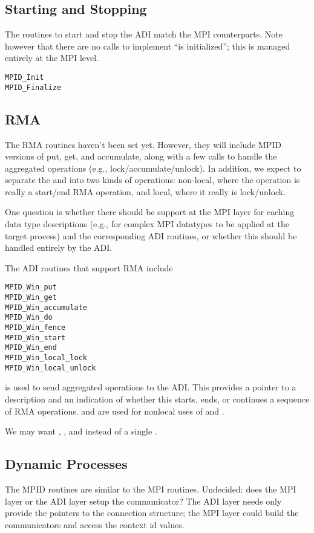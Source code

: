 {\subsection{Starting and Stopping}
The routines to start and stop the ADI match the MPI counterparts.
Note however that there are no calls to implement ``is initialized'';
this is managed entirely at the MPI level.
\begin{verbatim}
MPID_Init
MPID_Finalize
\end{verbatim}

\subsection{RMA}
The RMA routines haven't been set yet.  However, they will include
MPID versions of put, get, and accumulate, along with a few calls to
handle the aggregated operations (e.g., lock/accumulate/unlock).
In addition, we expect to separate the  and
 into two kinds of operations: non-local, where
the operation is really a start/end RMA operation, and local, where it
really is lock/unlock.

One question is whether there should be support at the MPI layer for
caching data type descriptions (e.g., for complex MPI datatypes to be
applied at the target process) and the corresponding ADI routines, or
whether this should be handled entirely by the ADI.

The ADI routines that support RMA include
\begin{verbatim}
MPID_Win_put
MPID_Win_get
MPID_Win_accumulate
MPID_Win_do
MPID_Win_fence
MPID_Win_start
MPID_Win_end
MPID_Win_local_lock
MPID_Win_local_unlock
\end{verbatim}
 is used to send aggregated operations to the ADI.  This
provides a pointer to a description and an indication of whether this starts,
ends, or continues a sequence of RMA operations.   and
 are used for nonlocal uses of  and .

We may want , , and
 instead of a single .

\subsection{Dynamic Processes}
The MPID routines are similar to the MPI routines.  Undecided: does
the MPI layer or the ADI layer setup the communicator?  The ADI layer
needs only provide the pointers to the connection structure; the MPI
layer could build the communicators and access the context id values.

}
